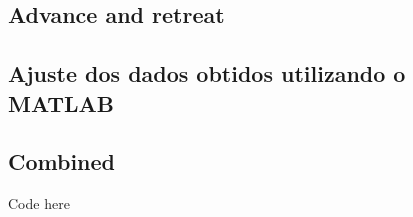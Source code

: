 \documentclass[portuguese,11pt,a4paper,titlepage]{article}
\newcommand{\srcdir}{..}
\newcommand{\matlabdir}{"../MATLAB fittings"}
\begin{document}
\subsection{Advance and retreat}

\subsection{Ajuste dos dados obtidos utilizando o MATLAB}

\subsection{Combined}
Code here
\end{document}
